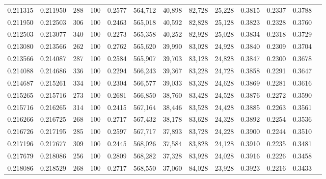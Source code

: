 \begin{tabular}{rrrrrrrrrrrrr}
0.211315 & 0.211950 &   288 & 100 &                                     0.2577 & 564,712 &  40,898 &  82,728 &  25,228 & 0.3815 & 0.2337 & 0.3788 \\
0.211950 & 0.212503 &   306 & 100 &                                     0.2463 & 565,018 &  40,592 &  82,828 &  25,128 & 0.3823 & 0.2328 & 0.3760 \\
0.212503 & 0.213077 &   340 & 100 &                                     0.2273 & 565,358 &  40,252 &  82,928 &  25,028 & 0.3834 & 0.2318 & 0.3729 \\
0.213080 & 0.213566 &   262 & 100 &                                     0.2762 & 565,620 &  39,990 &  83,028 &  24,928 & 0.3840 & 0.2309 & 0.3704 \\
0.213566 & 0.214087 &   287 & 100 &                                     0.2584 & 565,907 &  39,703 &  83,128 &  24,828 & 0.3847 & 0.2300 & 0.3678 \\
0.214088 & 0.214686 &   336 & 100 &                                     0.2294 & 566,243 &  39,367 &  83,228 &  24,728 & 0.3858 & 0.2291 & 0.3647 \\
0.214687 & 0.215261 &   334 & 100 &                                     0.2304 & 566,577 &  39,033 &  83,328 &  24,628 & 0.3869 & 0.2281 & 0.3616 \\
0.215265 & 0.215716 &   273 & 100 &                                     0.2681 & 566,850 &  38,760 &  83,428 &  24,528 & 0.3876 & 0.2272 & 0.3590 \\
0.215716 & 0.216265 &   314 & 100 &                                     0.2415 & 567,164 &  38,446 &  83,528 &  24,428 & 0.3885 & 0.2263 & 0.3561 \\
0.216266 & 0.216725 &   268 & 100 &                                     0.2717 & 567,432 &  38,178 &  83,628 &  24,328 & 0.3892 & 0.2254 & 0.3536 \\
0.216726 & 0.217195 &   285 & 100 &                                     0.2597 & 567,717 &  37,893 &  83,728 &  24,228 & 0.3900 & 0.2244 & 0.3510 \\
0.217196 & 0.217677 &   309 & 100 &                                     0.2445 & 568,026 &  37,584 &  83,828 &  24,128 & 0.3910 & 0.2235 & 0.3481 \\
0.217679 & 0.218086 &   256 & 100 &                                     0.2809 & 568,282 &  37,328 &  83,928 &  24,028 & 0.3916 & 0.2226 & 0.3458 \\
0.218086 & 0.218529 &   268 & 100 &                                     0.2717 & 568,550 &  37,060 &  84,028 &  23,928 & 0.3923 & 0.2216 & 0.3433 \\

\end{tabular}
